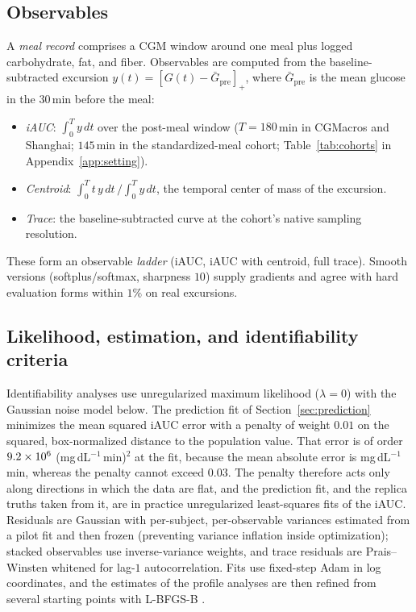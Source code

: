 \subsection{Observables}
\label{sec:observables}

A \emph{meal record} comprises a CGM window around one meal plus logged carbohydrate, fat, and fiber.
Observables are computed from the baseline-subtracted excursion $y(t)=[G(t)-\bar G_{\mathrm{pre}}]_+$, where $\bar G_{\mathrm{pre}}$ is the mean glucose in the $30$\,min before the meal:
\begin{itemize}
\item \emph{iAUC}: $\int_0^T y\,dt$ over the post-meal window ($T=180$\,min in CGMacros and Shanghai; $145$\,min in the standardized-meal cohort; Table~\ref{tab:cohorts} in Appendix~\ref{app:setting}).
\item \emph{Centroid}: $\int_0^T t\,y\,dt \,/ \int_0^T y\,dt$, the temporal center of mass of the excursion.
\item \emph{Trace}: the baseline-subtracted curve at the cohort's native sampling resolution.
\end{itemize}
These form an observable \emph{ladder} (iAUC, iAUC with centroid, full trace).
Smooth versions (softplus/softmax, sharpness $10$) supply gradients and agree with hard evaluation forms within $1\%$ on real excursions.

\subsection{Likelihood, estimation, and identifiability criteria}
\label{sec:estimation}

Identifiability analyses use unregularized maximum likelihood ($\lambda=0$) with the Gaussian noise model below.
The prediction fit of Section~\ref{sec:prediction} minimizes the mean squared iAUC error with a penalty of weight $0.01$ on the squared, box-normalized distance to the population value.
That error is of order $9.2\times10^{6}$ (mg\,dL$^{-1}$\,min)$^2$ at the fit, because the mean absolute error is \resMaeGradThree{} mg\,dL$^{-1}$\,min, whereas the penalty cannot exceed $0.03$.
The penalty therefore acts only along directions in which the data are flat, and the prediction fit, and the replica truths taken from it, are in practice unregularized least-squares fits of the iAUC.
Residuals are Gaussian with per-subject, per-observable variances estimated from a pilot fit and then frozen (preventing variance inflation inside optimization); stacked observables use inverse-variance weights, and trace residuals are Prais--Winsten whitened for lag-$1$ autocorrelation.
Fits use fixed-step Adam \citep{kingma2015adam} in log coordinates, and the estimates of the profile analyses are then refined from several starting points with L-BFGS-B \citep{byrd1995limited}.

